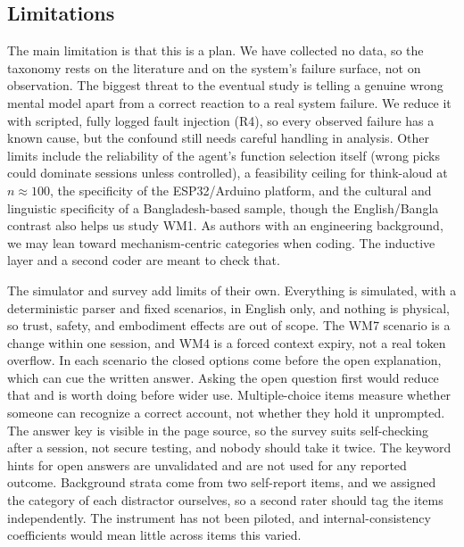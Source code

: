 \documentclass[sigconf]{acmart}
\begin{document}
\subsection{Limitations}\label{sec:limits}
The main limitation is that this is a plan. We have collected no data, so the taxonomy rests on the literature and on the system's failure surface, not on observation. The biggest threat to the eventual study is telling a genuine wrong mental model apart from a correct reaction to a real system failure. We reduce it with scripted, fully logged fault injection (R4), so every observed failure has a known cause, but the confound still needs careful handling in analysis. Other limits include the reliability of the agent's function selection itself (wrong picks could dominate sessions unless controlled), a feasibility ceiling for think-aloud at $n\!\approx\!100$, the specificity of the ESP32/Arduino platform, and the cultural and linguistic specificity of a Bangladesh-based sample, though the English/Bangla contrast also helps us study WM1. As authors with an engineering background, we may lean toward mechanism-centric categories when coding. The inductive layer and a second coder are meant to check that.

The simulator and survey add limits of their own. Everything is simulated, with a deterministic parser and fixed scenarios, in English only, and nothing is physical, so trust, safety, and embodiment effects are out of scope. The WM7 scenario is a change within one session, and WM4 is a forced context expiry, not a real token overflow. In each scenario the closed options come before the open explanation, which can cue the written answer. Asking the open question first would reduce that and is worth doing before wider use. Multiple-choice items measure whether someone can recognize a correct account, not whether they hold it unprompted. The answer key is visible in the page source, so the survey suits self-checking after a session, not secure testing, and nobody should take it twice. The keyword hints for open answers are unvalidated and are not used for any reported outcome. Background strata come from two self-report items, and we assigned the category of each distractor ourselves, so a second rater should tag the items independently. The instrument has not been piloted, and internal-consistency coefficients would mean little across items this varied.
\end{document}
